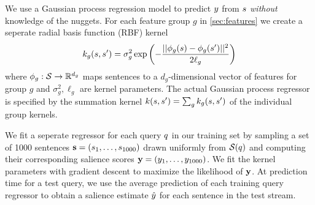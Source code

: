 We use a Gaussian process regression model \citep{rasmussen2004gaussian}
to predict $y$ from $s$ 
\emph{without} knowledge of the nuggets. 
For each feature group $g$ in \autoref{sec:features} we create a seperate
radial basis function (RBF) kernel 
\[
  k_g(s, s^\prime) =\sigma^2_g
     \exp\left(
 - \frac{|| \phi_g(s) - \phi_g(s^\prime)  ||^2}{2\ell_g}\right)
\]
where $\phi_g : \mathcal{S} \rightarrow \mathbb{R}^{d_g}$ maps sentences to a
$d_g$-dimensional vector of features for group $g$ and $\sigma^2_g, \ell_g$
are kernel parameters. The actual Gaussian process regressor is specified by 
the summation kernel 
$k(s, s^\prime) = \sum_g k_g(s, s^\prime)$
of the individual group kernels.

We fit a seperate regressor for each query $q$ in our training set
by sampling a set of 1000 sentences 
$\mathbf{s} = (s_1, \ldots, s_{1000})$ 
drawn uniformly from $\mathcal{S}(q)$ and computing their 
corresponding salience scores 
$\mathbf{y} = (y_1, \ldots, y_{1000})$. We fit the 
kernel parameters with gradient descent to maximize the likelihood of
$\mathbf{y}$.
At prediction time for a test query, we 
use the average prediction of each training query regressor to obtain
a salience estimate $\hat{y}$ for each sentence in the test stream.




